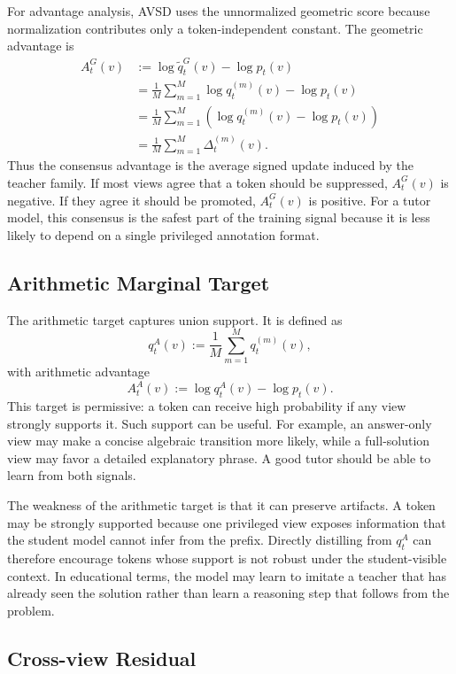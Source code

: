 For advantage analysis, AVSD uses the unnormalized geometric score because normalization contributes only a token-independent constant. The geometric advantage is
\[
\begin{aligned}
    A_t^G(v)
    &:= \log \widetilde{q}_t^G(v)-\log p_t(v)\\
    &= \frac{1}{M}\sum_{m=1}^{M}\log q_t^{(m)}(v)-\log p_t(v)\\
    &= \frac{1}{M}\sum_{m=1}^{M}
       \left(\log q_t^{(m)}(v)-\log p_t(v)\right)\\
    &= \frac{1}{M}\sum_{m=1}^{M}\Delta_t^{(m)}(v).
\end{aligned}
\]
Thus the consensus advantage is the average signed update induced by the teacher family. If most views agree that a token should be suppressed, $A_t^G(v)$ is negative. If they agree it should be promoted, $A_t^G(v)$ is positive. For a tutor model, this consensus is the safest part of the training signal because it is less likely to depend on a single privileged annotation format.

\subsection{Arithmetic Marginal Target}

The arithmetic target captures union support. It is defined as
\[
    q_t^A(v) := \frac{1}{M}\sum_{m=1}^{M}q_t^{(m)}(v),
\]
with arithmetic advantage
\[
    A_t^A(v) := \log q_t^A(v)-\log p_t(v).
\]
This target is permissive: a token can receive high probability if any view strongly supports it. Such support can be useful. For example, an answer-only view may make a concise algebraic transition more likely, while a full-solution view may favor a detailed explanatory phrase. A good tutor should be able to learn from both signals.

The weakness of the arithmetic target is that it can preserve artifacts. A token may be strongly supported because one privileged view exposes information that the student model cannot infer from the prefix. Directly distilling from $q_t^A$ can therefore encourage tokens whose support is not robust under the student-visible context. In educational terms, the model may learn to imitate a teacher that has already seen the solution rather than learn a reasoning step that follows from the problem.

\subsection{Cross-view Residual}

